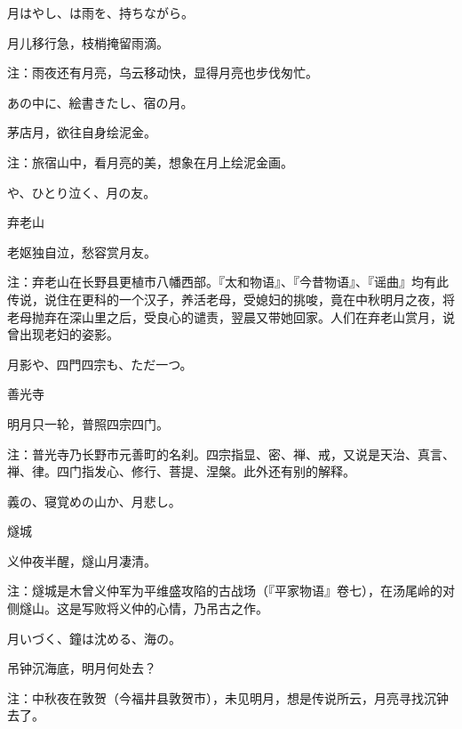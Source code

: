 \begin{haiku}
    {\FH 月はやし、は雨を、持ちながら。}

    {\FK 月儿移行急，枝梢掩留雨滴。}

    {\FT 注：雨夜还有月亮，乌云移动快，显得月亮也步伐匆忙。}
\end{haiku}

\begin{haiku}
    {\FH あの中に、絵書きたし、宿の月。}

    {\FK 茅店月，欲往自身绘泥金。}

    {\FT 注：旅宿山中，看月亮的美，想象在月上绘泥金画。}
\end{haiku}

\begin{haiku}
    {\FH {}や、ひとり泣く、月の友。}

    {\FK 弃老山}

    {\FK 老妪独自泣，愁容赏月友。}

    {\FT 注：弃老山在长野县更植市八幡西部。『太和物语』、『今昔物语』、『谣曲』均有此传说，说住在更科的一个汉子，养活老母，受媳妇的挑唆，竟在中秋明月之夜，将老母抛弃在深山里之后，受良心的谴责，翌晨又带她回家。人们在弃老山赏月，说曾出现老妇的姿影。}
\end{haiku}

\begin{haiku}
    {\FH 月影や、四門四宗も、ただ一つ。}

    {\FK 善光寺}

    {\FK 明月只一轮，普照四宗四门。}

    {\FT 注：普光寺乃长野市元善町的名刹。四宗指显、密、禅、戒，又说是天治、真言、禅、律。四门指发心、修行、菩提、涅槃。此外还有别的解释。}
\end{haiku}

\begin{haiku}
    {\FH 義の、寝覚めの山か、月悲し。}

    {\FK 燧城}

    {\FK 义仲夜半醒，燧山月凄清。}

    {\FT 注：燧城是木曾义仲军为平维盛攻陷的古战场（『平家物语』卷七），在汤尾岭的对侧燧山。这是写败将义仲的心情，乃吊古之作。}
\end{haiku}

\begin{haiku}
    {\FH 月いづく、鐘は沈める、海の。}

    {\FK 吊钟沉海底，明月何处去？}

    {\FT 注：中秋夜在敦贺（今福井县敦贺市），未见明月，想是传说所云，月亮寻找沉钟去了。}
\end{haiku}

